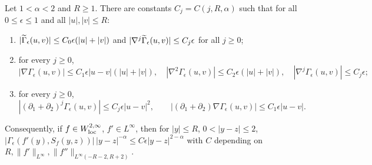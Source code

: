 \begin{lemma}
  \label{rmk:analysis_vanishing_diagonal}
  Let $1<\alpha<2$ and $R\ge1$. There are constants $C_j=C(j,R,\alpha)$ such that for all
  $0\le\epsilon\le1$ and all $|u|,|v|\le R$:
  \begin{enumerate}
    \item $|\widetilde{\Gamma}_\epsilon(u,v)|\le C_0\epsilon(|u|+|v|)$ and $|\nabla^j\widetilde{\Gamma}_\epsilon(u,v)|\le C_j\epsilon$ for all $j\ge0$;
    \item for every $j\ge0$,
      \begin{equation}\label{eqn:analysis_kernel_derivative_bounds}
      |\nabla\Gamma_\epsilon(u,v)|\le C_1\epsilon|u-v|(|u|+|v|),\quad
      |\nabla^2\Gamma_\epsilon(u,v)|\le C_2\epsilon(|u|+|v|),\quad
      |\nabla^j\Gamma_\epsilon(u,v)|\le C_j\epsilon;
      \end{equation}
    \item for every $j\ge0$,
      \begin{equation}\label{eqn:analysis_kernel_diagonal_derivative_bounds}
      |(\partial_1+\partial_2)^j\Gamma_\epsilon(u,v)|\le C_j\epsilon|u-v|^2,\qquad
      |(\partial_1+\partial_2)\nabla\Gamma_\epsilon(u,v)|\le C_1\epsilon|u-v|.
      \end{equation}
  \end{enumerate}
  Consequently, if $f\in W^{2,\infty}_{\textup{loc}}$, $f'\in L^\infty$, then for $|y|\le R$, $0<|y-z|\le 2$,
  $|\Gamma_\epsilon(f'(y),S_f(y,z))|\,|y-z|^{-\alpha}\le C\epsilon|y-z|^{2-\alpha}$ with $C$ depending on
  $R,\|f'\|_{L^\infty},\|f''\|_{L^\infty(-R-2,R+2)}$.
\end{lemma}
